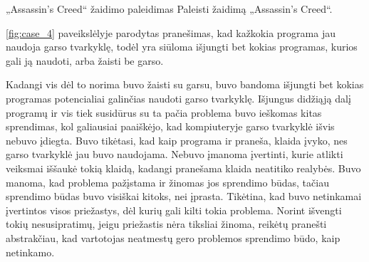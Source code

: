 ﻿\begin{xcase}{„Assassin's Creed“ žaidimo paleidimas}
  \xcgoal
  {
    Paleisti žaidimą „Assassin's Creed“.
  }
  \xctools
  {
    \ref{fig:case_4} paveikslėlyje parodytas pranešimas, kad kažkokia programa jau naudoja 
    garso tvarkyklę, todėl yra siūloma išjungti bet kokias programas, kurios gali ją naudoti, 
    arba žaisti be garso.

  }
  \xcresult
  {
    Kadangi vis dėl to norima buvo žaisti su garsu, buvo bandoma išjungti bet kokias programas 
    potencialiai galinčias naudoti garso tvarkyklę. Išjungus didžiąją dalį programų ir vis tiek 
    susidūrus su  ta pačia problema buvo ieškomas kitas sprendimas, kol galiausiai paaiškėjo, 
    kad kompiuteryje garso tvarkyklė išvis nebuvo įdiegta.
  }
  \xcprinciples
  {
    {
      Buvo tikėtasi, kad kaip programa ir praneša, klaida įvyko, nes garso tvarkyklė jau 
      buvo naudojama.
    }
    {
      Nebuvo įmanoma įvertinti, kurie atlikti veiksmai iššaukė tokią klaidą, kadangi pranešama 
      klaida neatitiko realybės.
    }
    {
      Buvo manoma, kad problema pažįstama ir žinomas jos sprendimo būdas, tačiau sprendimo 
      būdas buvo visiškai kitoks, nei įprasta.
    }
  }
  \xcthoughts
  {
    Tikėtina, kad buvo netinkamai įvertintos visos priežastys, dėl kurių gali kilti tokia 
    problema. Norint išvengti tokių nesusipratimų, jeigu priežastis nėra tiksliai žinoma, 
    reikėtų pranešti abstrakčiau, kad vartotojas neatmestų gero problemos sprendimo būdo, 
    kaip netinkamo.
  }
\end{xcase}